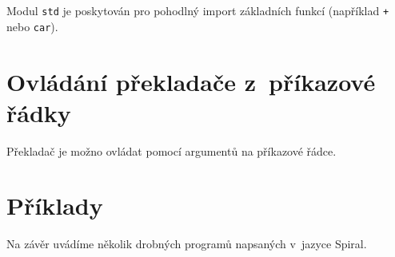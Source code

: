 Modul \texttt{std} je poskytován pro pohodlný import základních funkcí
(například \texttt{+} nebo \texttt{car}).

\section{Ovládání překladače z~příkazové řádky}

Překladač je možno ovládat pomocí argumentů na příkazové řádce.

\section{Příklady}

Na závěr uvádíme několik drobných programů napsaných v~jazyce Spiral.
